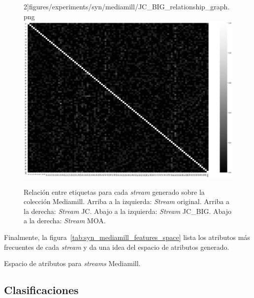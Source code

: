 \begin{figure}[htbp]
		2]{figures/experiments/syn/mediamill/JC_BIG_relationship_graph.png}
	\includegraphics[width=\linewidth /
		2]{figures/experiments/syn/mediamill/MOA_relationship_graph.png}
	\caption[Relación entre etiquetas para cada \textit{stream} generado sobre
		la colección Mediamill.]{Relación entre etiquetas para cada \textit{stream} generado sobre
		la colección Mediamill. Arriba a la izquierda: \textit{Stream} original.
		Arriba a la derecha: \textit{Stream} JC. Abajo a la izquierda:
		\textit{Stream} JC\_BIG. Abajo a la derecha: \textit{Stream} MOA.}
	\label{fig:syn_mediamill_label_relationship}
\end{figure}

Finalmente, la figura~\ref{tab:syn_mediamill_features_space} lista los atributos más
frecuentes de cada \textit{stream} y da una idea del espacio de atributos
generado.

\begin{table}[htbp]
	\centering
	\begin{adjustbox}{max width=\textwidth}
		
	\end{adjustbox}
	\caption{Espacio de atributos para \textit{streams} Mediamill.}
	\label{tab:syn_mediamill_features_space}
\end{table}

\subsection{Clasificaciones}

